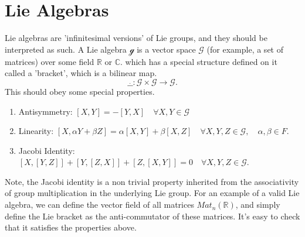 \documentclass[11pt, oneside]{article}   	%
\theoremstyle{slanted}
\begin{document}
\pagebreak 
\section{Lie Algebras}

Lie algebras are 'infinitesimal versions' of Lie groups, and they should be interpreted as such. A Lie algebra $\mathcal{g}$ is a vector space $\mathcal{G}$ (for example, a set of matrices) over some field $\mathbb{ R} $ or $\mathbb{ C }$. which has a special structure defined on it called a 'bracket', which is a bilinear map. 
\[
	\_ \dot \_ : \mathcal{G} \times \mathcal{G} \rightarrow \mathcal{G}. 
\]
This should obey some special properties. 
\begin{enumerate}
	\item Antisymmetry: $[X, Y] = - [Y, X] \quad \forall X, Y \in \mathcal{G}$
	\item Linearity: $[X, \alpha Y + \beta Z] = \alpha [X, Y] + \beta [X, Z] \quad \forall X, Y, Z \in \mathcal{G }, \quad \alpha, \beta \in F$. 
	\item Jacobi Identity: $[X, [Y, Z]] + [Y, [Z, X]] + [Z, [X, Y]] = 0  \quad \forall X, Y, Z \in \mathcal{G}$. 
\end{enumerate}
Note, the Jacobi identity is a non trivial property inherited from the associativity of group multiplication in the underlying Lie group. 
For an example of a valid Lie algebra, we can define the vector field of all matrices $Mat_n(\mathbb{R})$, and simply define the Lie bracket as the anti-commutator of these matrices. It's easy to check that it satisfies the properties above. 
\end{document}
